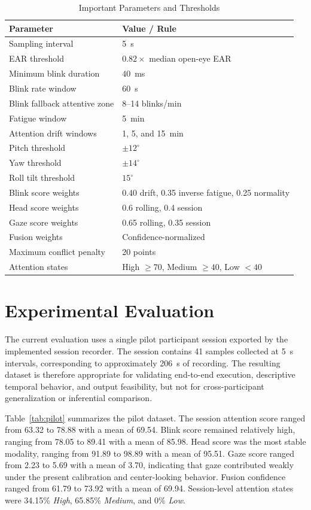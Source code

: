 \documentclass[conference]{IEEEtran}
\begin{document}
\begin{table}[!t]
\caption{Important Parameters and Thresholds}
\label{tab:parameters}
\centering
\footnotesize
\begin{tabular}{p{3.0cm} p{4.3cm}}
\toprule
\textbf{Parameter} & \textbf{Value / Rule} \\
\midrule
Sampling interval & 5~s \\
EAR threshold & $0.82\times$ median open-eye EAR \\
Minimum blink duration & 40~ms \\
Blink rate window & 60~s \\
Blink fallback attentive zone & 8--14 blinks/min \\
Fatigue window & 5~min \\
Attention drift windows & 1, 5, and 15~min \\
Pitch threshold & $\pm12^\circ$ \\
Yaw threshold & $\pm14^\circ$ \\
Roll tilt threshold & $15^\circ$ \\
Blink score weights & 0.40 drift, 0.35 inverse fatigue, 0.25 normality \\
Head score weights & 0.6 rolling, 0.4 session \\
Gaze score weights & 0.65 rolling, 0.35 session \\
Fusion weights & Confidence-normalized \\
Maximum conflict penalty & 20 points \\
Attention states & High $\geq 70$, Medium $\geq 40$, Low $< 40$ \\
\bottomrule
\end{tabular}
\end{table}

\section{Experimental Evaluation}
The current evaluation uses a single pilot participant session exported by the implemented session recorder. The session contains 41 samples collected at 5~s intervals, corresponding to approximately 206~s of recording. The resulting dataset is therefore appropriate for validating end-to-end execution, descriptive temporal behavior, and output feasibility, but not for cross-participant generalization or inferential comparison.

Table~\ref{tab:pilot} summarizes the pilot dataset. The session attention score ranged from 63.32 to 78.88 with a mean of 69.54. Blink score remained relatively high, ranging from 78.05 to 89.41 with a mean of 85.98. Head score was the most stable modality, ranging from 91.89 to 98.89 with a mean of 95.51. Gaze score ranged from 2.23 to 5.69 with a mean of 3.70, indicating that gaze contributed weakly under the present calibration and center-looking behavior. Fusion confidence ranged from 61.79 to 73.92 with a mean of 69.94. Session-level attention states were 34.15\% \textit{High}, 65.85\% \textit{Medium}, and 0\% \textit{Low}.
\end{document}
